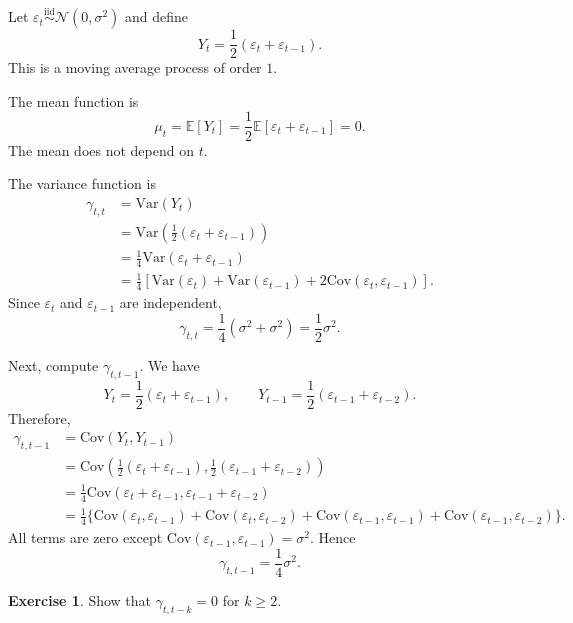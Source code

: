 \documentclass[12pt,oneside]{book}
\numberwithin{equation}{section}
\theoremstyle{definition}
\newtheorem{exercise}{Exercise}[section]
\theoremstyle{plain}
\theoremstyle{remark}
\newcommand{\E}{\mathbb{E}}
\newcommand{\Var}{\mathrm{Var}}
\newcommand{\Cov}{\mathrm{Cov}}
\newcommand{\iid}{\overset{\text{iid}}{\sim}}
\newcommand{\Normal}{\mathcal{N}}
\begin{document}
Let $\varepsilon_t \iid \Normal(0,\sigma^2)$ and define
\[
Y_t
=
\frac{1}{2}(\varepsilon_t+\varepsilon_{t-1}).
\]
This is a moving average process of order $1$.

The mean function is
\[
\mu_t
=
\E[Y_t]
=
\frac{1}{2}\E[\varepsilon_t+\varepsilon_{t-1}]
=
0.
\]
The mean does not depend on $t$.

The variance function is
\begin{align*}
\gamma_{t,t}
&=
\Var(Y_t) \\
&=
\Var\left(\frac{1}{2}(\varepsilon_t+\varepsilon_{t-1})\right) \\
&=
\frac{1}{4}\Var(\varepsilon_t+\varepsilon_{t-1}) \\
&=
\frac{1}{4}\left[
\Var(\varepsilon_t)+\Var(\varepsilon_{t-1})
+
2\Cov(\varepsilon_t,\varepsilon_{t-1})
\right].
\end{align*}
Since $\varepsilon_t$ and $\varepsilon_{t-1}$ are independent,
\[
\gamma_{t,t}
=
\frac{1}{4}(\sigma^2+\sigma^2)
=
\frac{1}{2}\sigma^2.
\]

Next, compute $\gamma_{t,t-1}$. We have
\[
Y_t=\frac{1}{2}(\varepsilon_t+\varepsilon_{t-1}),
\qquad
Y_{t-1}=\frac{1}{2}(\varepsilon_{t-1}+\varepsilon_{t-2}).
\]
Therefore,
\begin{align*}
\gamma_{t,t-1}
&=
\Cov(Y_t,Y_{t-1}) \\
&=
\Cov\left(
\frac{1}{2}(\varepsilon_t+\varepsilon_{t-1}),
\frac{1}{2}(\varepsilon_{t-1}+\varepsilon_{t-2})
\right) \\
&=
\frac{1}{4}\Cov(\varepsilon_t+\varepsilon_{t-1},
\varepsilon_{t-1}+\varepsilon_{t-2}) \\
&=
\frac{1}{4}\{
\Cov(\varepsilon_t,\varepsilon_{t-1})
+
\Cov(\varepsilon_t,\varepsilon_{t-2})
+
\Cov(\varepsilon_{t-1},\varepsilon_{t-1})
+
\Cov(\varepsilon_{t-1},\varepsilon_{t-2})
\}.
\end{align*}
All terms are zero except $\Cov(\varepsilon_{t-1},\varepsilon_{t-1})=\sigma^2$. Hence
\[
\gamma_{t,t-1}
=
\frac{1}{4}\sigma^2.
\]

\begin{exercise}
Show that $\gamma_{t,t-k}=0$ for $k\geq 2$.
\end{exercise}
\end{document}
